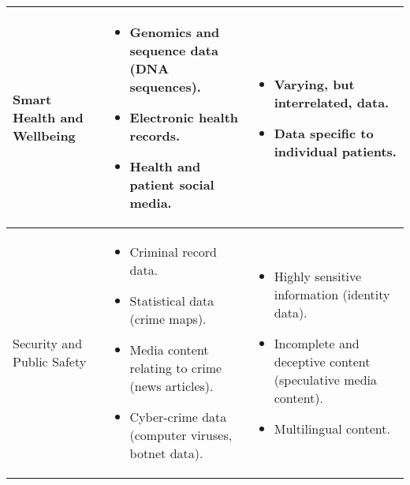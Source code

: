 \begin{landscape}
\begin{table}[H]
\begin{tabular}{ | p{4cm} | p{10cm} | p{10cm} | }
Smart Health and Wellbeing
&
\begin{itemize}[leftmargin=*]
  \item Genomics and sequence data (DNA sequences).
  \item Electronic health records.
  \item Health and patient social media.
\end{itemize}
&
\begin{itemize}[leftmargin=*]
  \item Varying, but interrelated, data.
  \item Data specific to individual patients.
\end{itemize}
\\ \hline

Security and Public Safety
&
\begin{itemize}[leftmargin=*]
  \item Criminal record data.
  \item Statistical data (crime maps).
  \item Media content relating to crime (news articles).
  \item Cyber-crime data (computer viruses, botnet data).
\end{itemize}
&
\begin{itemize}[leftmargin=*]
  \item Highly sensitive information (identity data).
  \item Incomplete and deceptive content (speculative media content).
  \item Multilingual content.
\end{itemize}
\\ \hline


\end{tabular}
\end{table}
\end{landscape}
